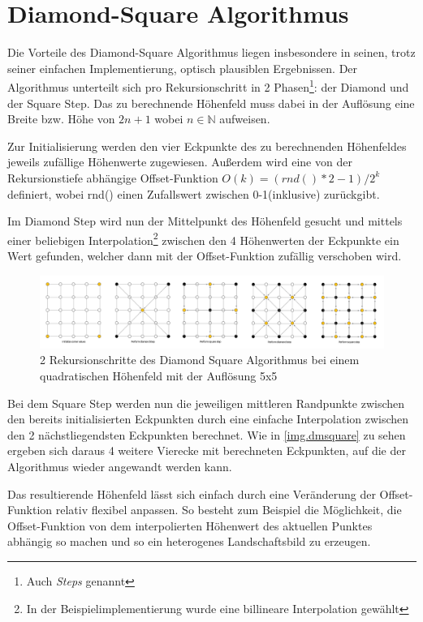 \chapter{Diamond-Square Algorithmus}
Die Vorteile des Diamond-Square Algorithmus liegen insbesondere in seinen, trotz seiner einfachen Implementierung, optisch plausiblen Ergebnissen. 
Der Algorithmus unterteilt sich pro Rekursionschritt in 2 Phasen\footnote{Auch \emph{Steps} genannt}: der Diamond und der Square Step. Das zu berechnende Höhenfeld muss dabei in der Auflösung eine Breite bzw. Höhe von $2n+1$ wobei $ n\in\mathbb{N}$ aufweisen.

Zur Initialisierung werden den vier Eckpunkte des zu berechnenden Höhenfeldes jeweils zufällige Höhenwerte zugewiesen. Außerdem wird eine von der Rekursionstiefe abhängige Offset-Funktion $O(k)=(rnd()*2-1)/2^k$ definiert, wobei rnd() einen Zufallswert zwischen 0-1(inklusive) zurückgibt.

Im Diamond Step wird nun der Mittelpunkt des Höhenfeld gesucht und mittels einer beliebigen Interpolation\footnote{In der Beispielimplementierung wurde eine billineare Interpolation gewählt} zwischen den 4 Höhenwerten der Eckpunkte ein Wert gefunden, welcher dann mit der Offset-Funktion zufällig verschoben wird.
\begin{figure}
	\centering
	\includegraphics[width=\textwidth]{images/Diamond_Square.png}
	\caption{2 Rekursionschritte des Diamond Square Algorithmus bei einem quadratischen Höhenfeld mit der Auflösung 5x5}\label{img.dmsquare}
\end{figure}
Bei dem Square Step werden nun die jeweiligen mittleren Randpunkte zwischen den bereits initialisierten Eckpunkten durch eine einfache Interpolation zwischen den 2 nächstliegendsten Eckpunkten berechnet.
Wie in \autoref{img.dmsquare} zu sehen ergeben sich daraus 4 weitere Vierecke mit berechneten Eckpunkten, auf die der Algorithmus wieder angewandt werden kann.

Das resultierende Höhenfeld lässt sich einfach durch eine Veränderung der Offset-Funktion relativ flexibel anpassen. So besteht zum Beispiel die Möglichkeit, die Offset-Funktion von dem interpolierten Höhenwert des aktuellen Punktes abhängig so machen und so ein heterogenes Landschaftsbild zu erzeugen.

